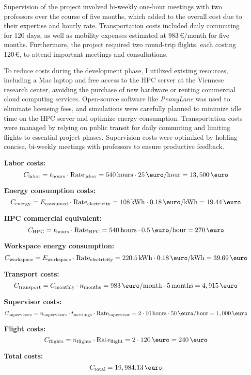 Supervision of the project involved bi-weekly one-hour meetings with two professors over the course of five months, which added to the overall cost due to their expertise and hourly rate. Transportation costs included daily commuting for 120 days, as well as mobility expenses estimated at 983\,\euro/month for five months. Furthermore, the project required two round-trip flights, each costing 120\,\euro, to attend important meetings and consultations.

To reduce costs during the development phase, I utilized existing resources, including a Mac laptop and free access to the HPC server at the Viennese research center, avoiding the purchase of new hardware or renting commercial cloud computing services. Open-source software like \emph{PennyLane} was used to eliminate licensing fees, and simulations were carefully planned to minimize idle time on the HPC server and optimize energy consumption. Transportation costs were managed by relying on public transit for daily commuting and limiting flights to essential project phases. Supervision costs were optimized by holding concise, bi-weekly meetings with professors to ensure productive feedback.

\begin{ProjectStructure}
    \textbf{Labor costs:}   
    \[
    C_{\text{labor}} = t_{\text{hours}} \cdot \text{Rate}_{\text{labor}} = 540 \, \text{hours} \cdot 25 \, \text{\euro/hour} = 13,500 \, \text{\euro}
    \]

    \textbf{Energy consumption costs:}   
    \[
    C_{\text{energy}} = E_{\text{consumed}} \cdot \text{Rate}_{\text{electricity}} = 108 \, \text{kWh} \cdot 0.18 \, \text{\euro/kWh} = 19.44 \, \text{\euro}
    \]

    \textbf{HPC commercial equivalent:}  
    \[
    C_{\text{HPC}} = t_{\text{hours}} \cdot \text{Rate}_{\text{HPC}} = 540 \, \text{hours} \cdot 0.5 \, \text{\euro/hour} = 270 \, \text{\euro}
    \]

    \textbf{Workspace energy consumption:}  
    \[
    C_{\text{workspace}} = E_{\text{workspace}} \cdot \text{Rate}_{\text{electricity}} = 220.5 \, \text{kWh} \cdot 0.18 \, \text{\euro/kWh} = 39.69 \, \text{\euro}
    \]

    \textbf{Transport costs:}   
    \[
    C_{\text{transport}} = C_{\text{monthly}} \cdot n_{\text{months}} = 983 \, \text{\euro/month} \cdot 5 \, \text{months} = 4,915 \, \text{\euro}
    \]

    \textbf{Supervisor costs:}  
    \[
    C_{\text{supervisors}} = n_{\text{supervisors}} \cdot t_{\text{meetings}} \cdot \text{Rate}_{\text{supervisor}} = 2 \cdot 10 \, \text{hours} \cdot 50 \, \text{\euro/hour} = 1,000 \, \text{\euro}
    \]

    \textbf{Flight costs:}    
    \[
    C_{\text{flights}} = n_{\text{flights}} \cdot \text{Rate}_{\text{flight}} = 2 \cdot 120 \, \text{\euro} = 240 \, \text{\euro}
    \]

    \textbf{Total costs:}
    \[
    C_{\text{total}} =  19,984.13 \, \text{\euro}
    \]
\end{ProjectStructure}

